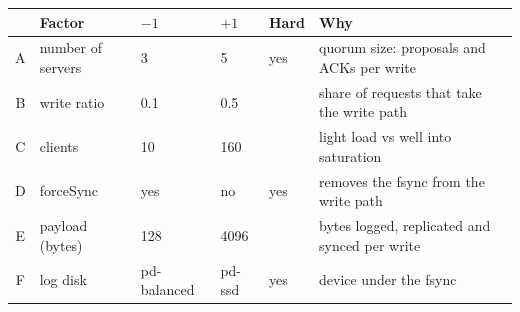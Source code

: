 \begin{tabularx}{\linewidth}{@{}cllll>{\raggedright\arraybackslash}X@{}}
\toprule
& Factor & $-1$ & $+1$ & Hard & Why \\
\midrule
A & number of servers & 3 & 5 & yes & quorum size: proposals and ACKs per write \\
B & write ratio & 0.1 & 0.5 &  & share of requests that take the write path \\
C & clients & 10 & 160 &  & light load vs well into saturation \\
D & forceSync & yes & no & yes & removes the fsync from the write path \\
E & payload (bytes) & 128 & 4096 &  & bytes logged, replicated and synced per write \\
F & log disk & pd-balanced & pd-ssd & yes & device under the fsync \\
\bottomrule
\end{tabularx}
